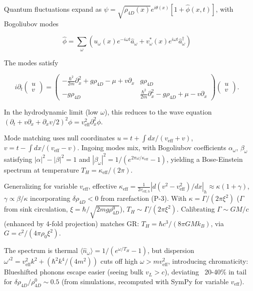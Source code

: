 \documentclass{article}
\begin{document}
Quantum fluctuations expand as $\psi = \sqrt{\rho_{4D}(x)} e^{i \theta(x)} [1 + \hat{\phi}(x,t)]$, with Bogoliubov modes

\[
\hat{\phi} = \sum_\omega (u_\omega(x) e^{-i\omega t} \hat{a}_\omega + v_\omega^*(x) e^{i\omega t} \hat{a}_\omega^\dagger)
\]

The modes satisfy

\[
i \partial_t \begin{pmatrix} u \\ v \end{pmatrix} = \begin{pmatrix} -\frac{\hbar^2}{2m} \partial_x^2 + g \rho_{4D} - \mu + v \partial_x & g \rho_{4D} \\ -g \rho_{4D} & \frac{\hbar^2}{2m} \partial_x^2 - g \rho_{4D} + \mu - v \partial_x \end{pmatrix} \begin{pmatrix} u \\ v \end{pmatrix}.
\]

In the hydrodynamic limit (low $\omega$), this reduces to the wave equation $(\partial_t + v \partial_x + \partial_x v / 2)^2 \phi = v_{\text{eff}}^2 \partial_x^2 \phi$.

Mode matching uses null coordinates $u = t + \int dx / (v_{\text{eff}} + v)$, $v = t - \int dx / (v_{\text{eff}} - v)$. Ingoing modes mix, with Bogoliubov coefficients $\alpha_\omega$, $\beta_\omega$ satisfying $|\alpha|^2 - |\beta|^2 = 1$ and $|\beta_\omega|^2 = 1 / (e^{2\pi \omega / \kappa_{\text{eff}}} - 1)$, yielding a Bose-Einstein spectrum at temperature $T_H = \kappa_{\text{eff}} / (2\pi)$.

Generalizing for variable $v_{\text{eff}}$, effective $\kappa_{\text{eff}} = \frac{1}{2 v_{\text{eff},h}} | d(v^2 - v_{\text{eff}}^2)/dx |_h \approx \kappa (1 + \gamma)$, $\gamma \propto \beta / \kappa$ incorporating $\delta \rho_{4D} < 0$ from rarefaction (P-3). With $\kappa = \Gamma / (2\pi \xi^2)$ ($\Gamma$ from sink circulation, $\xi = \hbar / \sqrt{2 m g \rho_{4D}^0}$), $T_H \sim \Gamma / (2\pi \xi^2)$. Calibrating $\Gamma \sim G M / c$ (enhanced by 4-fold projection) matches GR: $T_H = \hbar c^3 / (8\pi G M k_B)$, via $G = c^2 / (4\pi \rho_0 \xi^2)$.

The spectrum is thermal $\langle \hat{n}_\omega \rangle = 1 / (e^{\omega / T_H} - 1)$, but dispersion $\omega'^2 = v_{\text{eff}}^2 k^2 + (\hbar^2 k^4 / (4 m^2))$ cuts off high $\omega > m v_{\text{eff}}^2$, introducing chromaticity: Blueshifted phonons escape easier (seeing bulk $v_L > c$), deviating ~20-40\% in tail for $\delta \rho_{4D} / \rho_{4D}^0 \sim 0.5$ (from simulations, recomputed with SymPy for variable $v_{\text{eff}}$).
\end{document}
